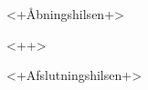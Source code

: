 \documentclass[a4paper]{scrlttr2}
\begin{document}
\begin{letter}{}
  \opening{<+Åbningshilsen+>}
  <++>
\closing{<+Afslutningshilsen+>}
\end{letter}
\end{document}

